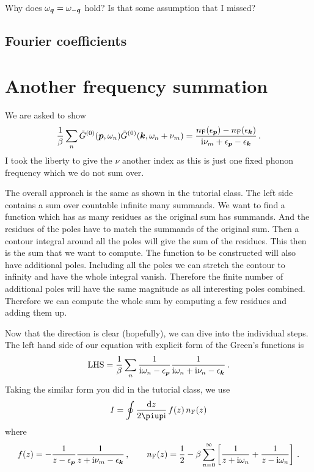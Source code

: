 \documentclass[11pt, english, fleqn, DIV=15, headinclude, BCOR=1cm]{scrartcl}
\begin{document}
\begin{question}
    Why does $\omegaq = \omegamq$ hold? Is that some assumption that I missed?
\end{question}

\subsection{Fourier coefficients}

\section{Another frequency summation}
\label{homework:2}

We are asked to show
\[
    \frac 1\beta \sum_{n}
    \tilde G^{(0)} (\vec p, \omega_n)
    \tilde G^{(0)} (\vec k, \omega_n + \nu_m)
    = \frac{n_\text F(\epsilon_{\vec p}) - n_\text F(\epsilon_{\vec k})}
        {\iup \nu_m + \epsilon_{\vec p} - \epsilon_{\vec k}} \,.
\]
I took the liberty to give the $\nu$ another index as this is just one fixed
phonon frequency which we do not sum over.

The overall approach is the same as shown in the tutorial class. The left side
contains a sum over countable infinite many summands. We want to find a
function which has as many residues as the original sum has summands. And the
residues of the poles have to match the summands of the original sum. Then a
contour integral around all the poles will give the sum of the residues. This
then is the sum that we want to compute. The function to be constructed will
also have additional poles. Including all the poles we can stretch the contour
to infinity and have the whole integral vanish. Therefore the finite number of
additional poles will have the same magnitude as all interesting poles
combined. Therefore we can compute the whole sum by computing a few residues
and adding them up.

Now that the direction is clear (hopefully), we can dive into the individual
steps. The left hand side of our equation with explicit form of the Green's
functions is
\[
    \text{LHS} = \frac{1}{\beta} \sum_n \frac{1}{\iup \omega_n - \epsilon_{\vec
    p}} \frac{1}{\iup \omega_n + \iup \nu_n - \epsilon_{\vec k}} \,.
\]
Taking the similar form you did in the tutorial class, we use
\[
    I = \oint \frac{\dif z}{2\piup \iup} \, f(z) \, n_\text F(z)
\]
where
\[
    f(z) = - \frac{1}{z - \epsilon_{\vec p}} \frac{1}{z + \iup \nu_m - \epsilon_{\vec k}}
    \eqnsep
    n_\text F(z) = \frac 12 - \beta \sum_{n = 0}^\infty \sbr{
        \frac1{z + \iup \omega_n}
        +
        \frac1{z - \iup \omega_n}
    } \,.
\]
\end{document}

